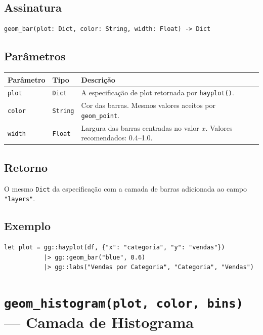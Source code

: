 \documentclass[12pt, a4paper, oneside]{book}
\newcommand{\code}[1]{\texttt{#1}}
\begin{document}
\subsection*{Assinatura}

\begin{lstlisting}[style=inline]
geom_bar(plot: Dict, color: String, width: Float) -> Dict
\end{lstlisting}

\subsection*{Parâmetros}

\begin{tabularx}{\textwidth}{@{}lL{2.5cm}X@{}}
  \toprule
  \textbf{Parâmetro} & \textbf{Tipo} & \textbf{Descrição} \\
  \midrule
  \code{plot}  & \code{Dict}   & A especificação de plot retornada por \code{hayplot()}. \\[4pt]
  \code{color} & \code{String} & Cor das barras. Mesmos valores aceitos por \code{geom\_point}. \\[4pt]
  \code{width} & \code{Float}  & Largura das barras centradas no valor $x$. Valores recomendados: 0.4--1.0. \\
  \bottomrule
\end{tabularx}

\subsection*{Retorno}

O mesmo \code{Dict} da especificação com a camada de barras adicionada ao
campo \code{"layers"}.

\subsection*{Exemplo}

\begin{lstlisting}[caption={Gráfico de barras categórico}]
let plot = gg::hayplot(df, {"x": "categoria", "y": "vendas"})
           |> gg::geom_bar("blue", 0.6)
           |> gg::labs("Vendas por Categoria", "Categoria", "Vendas")
\end{lstlisting}

\section{\texttt{geom\_histogram(plot, color, bins)} --- Camada de Histograma}
\end{document}
